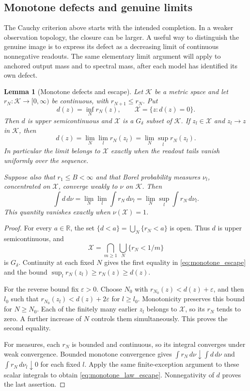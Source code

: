 \documentclass[11pt,a4paper]{amsart}
\numberwithin{equation}{section}
\newtheorem{lemma}[theorem]{Lemma}
\theoremstyle{definition}
\theoremstyle{remark}
\newcommand{\R}{\mathbb R}
\begin{document}
\subsection{Monotone defects and genuine limits}
The Cauchy criterion above starts with the intended completion. In a weaker observation topology, the closure can be larger. A useful way to distinguish the genuine image is to express its defect as a decreasing limit of continuous nonnegative readouts. The same elementary limit argument will apply to anchored output mass and to spectral mass, after each model has identified its own defect.

\begin{lemma}[Monotone defects and escape]\label{lem:monotone_defect}
Let $\mathcal K$ be a metric space and let $r_N:\mathcal K\to[0,\infty)$ be continuous, with $r_{N+1}\le r_N$. Put
\[
 d(z)=\inf_N r_N(z),\qquad \mathcal X=\{z:d(z)=0\}.
\]
Then $d$ is upper semicontinuous and $\mathcal X$ is a $G_\delta$ subset of $\mathcal K$. If $z_l\in\mathcal X$ and $z_l\to z$ in $\mathcal K$, then
\begin{equation}\label{eq:monotone_escape}
 d(z)=\lim_N\lim_l r_N(z_l)=\lim_N\sup_l r_N(z_l).
\end{equation}
In particular the limit belongs to $\mathcal X$ exactly when the readout tails vanish uniformly over the sequence.

Suppose also that $r_1\le B<\infty$ and that Borel probability measures $\nu_l$, concentrated on $\mathcal X$, converge weakly to $\nu$ on $\mathcal K$. Then
\begin{equation}\label{eq:monotone_law_escape}
 \int d\,d\nu
 =\lim_N\lim_l\int r_N\,d\nu_l
 =\lim_N\sup_l\int r_N\,d\nu_l.
\end{equation}
This quantity vanishes exactly when $\nu(\mathcal X)=1$.
\end{lemma}
\begin{proof}
For every $a\in\R$, the set $\{d<a\}=\bigcup_N\{r_N<a\}$ is open. Thus $d$ is upper semicontinuous, and
\[
 \mathcal X=\bigcap_{m\ge1}\bigcup_N\{r_N<1/m\}
\]
is $G_\delta$. Continuity at each fixed $N$ gives the first equality in \eqref{eq:monotone_escape} and the bound $\sup_l r_N(z_l)\ge r_N(z)\ge d(z)$.

For the reverse bound fix $\varepsilon>0$. Choose $N_0$ with $r_{N_0}(z)<d(z)+\varepsilon$, and then $l_0$ such that $r_{N_0}(z_l)<d(z)+2\varepsilon$ for $l\ge l_0$. Monotonicity preserves this bound for $N\ge N_0$. Each of the finitely many earlier $z_l$ belongs to $\mathcal X$, so its $r_N$ tends to zero. A further increase of $N$ controls them simultaneously. This proves the second equality.

For measures, each $r_N$ is bounded and continuous, so its integral converges under weak convergence. Bounded monotone convergence gives $\int r_N\,d\nu\downarrow\int d\,d\nu$ and $\int r_N\,d\nu_l\downarrow0$ for each fixed $l$. Apply the same finite-exception argument to these scalar integrals to obtain \eqref{eq:monotone_law_escape}. Nonnegativity of $d$ proves the last assertion.
\end{proof}
\end{document}
